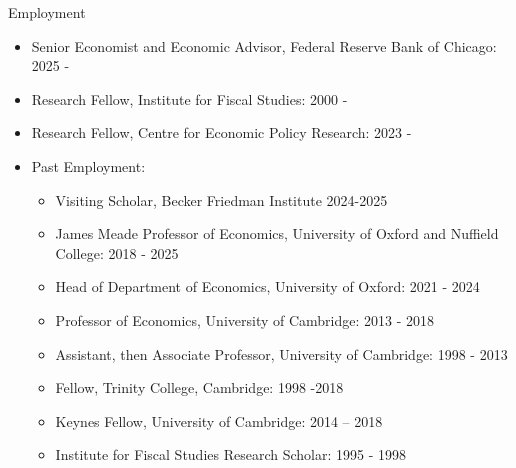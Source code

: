 \documentclass{resume} %
\begin{document}
\begin{rSection}{Employment}
\begin{itemize}
    \item Senior Economist and Economic Advisor, Federal Reserve Bank of Chicago: 2025 - 
    \item Research Fellow, Institute for Fiscal Studies: 2000 -
    \item Research Fellow, Centre for Economic Policy Research: 2023 -
\item Past Employment:
\begin{itemize}
    \item Visiting Scholar, Becker Friedman Institute 2024-2025
    \item James Meade Professor of Economics, University of Oxford and Nuffield College: 2018 - 2025
    \item Head of Department of Economics, University of Oxford: 2021 - 2024
    \item Professor of Economics, University of Cambridge: 2013 - 2018
     \item Assistant, then Associate Professor, University of Cambridge: 1998 - 2013
    \item Fellow, Trinity College, Cambridge: 1998 -2018
    \item Keynes Fellow, University of Cambridge: 2014 – 2018
    \item Institute for Fiscal Studies Research Scholar: 1995 - 1998
\end{itemize}
\end{itemize}

\end{rSection}
\end{document}
